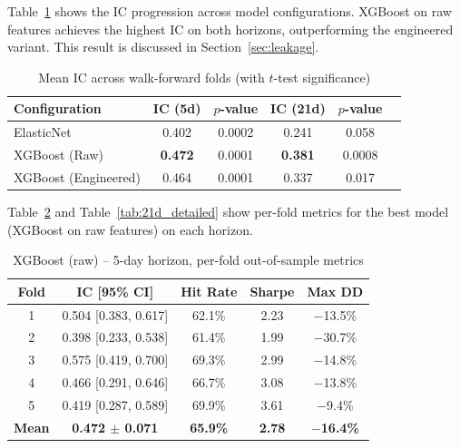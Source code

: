 \documentclass[11pt,a4paper]{article}
\makeatletter
\renewcommand\section{\@startsection{section}{1}{\z@}{-3.5ex \@plus -1ex \@minus -.2ex}{2.3ex \@plus.2ex}{\normalfont\large\bfseries\color{darkblue}}}
\makeatother
\begin{document}
\section{Results}

Table~\ref{tab:model_comp} shows the IC progression across model configurations. XGBoost on raw features achieves the highest IC on both horizons, outperforming the engineered variant. This result is discussed in Section~\ref{sec:leakage}.

\begin{table}[htbp]
\centering
\caption{Mean IC across walk-forward folds (with $t$-test significance)}
\label{tab:model_comp}
\begin{tabular}{@{}lccccc@{}}
\toprule
\textbf{Configuration} & \textbf{IC (5d)} & \textbf{$p$-value} & \textbf{IC (21d)} & \textbf{$p$-value} \\
\midrule
ElasticNet & 0.402 & 0.0002 & 0.241 & 0.058 \\
XGBoost (Raw) & \textbf{0.472} & 0.0001 & \textbf{0.381} & 0.0008 \\
XGBoost (Engineered) & 0.464 & 0.0001 & 0.337 & 0.017 \\
\bottomrule
\end{tabular}
\end{table}

Table~\ref{tab:5d_detailed} and Table~\ref{tab:21d_detailed} show per-fold metrics for the best model (XGBoost on raw features) on each horizon.

\begin{table}[htbp]
\centering
\caption{XGBoost (raw) -- 5-day horizon, per-fold out-of-sample metrics}
\label{tab:5d_detailed}
\begin{tabular}{@{}ccccc@{}}
\toprule
\textbf{Fold} & \textbf{IC [95\% CI]} & \textbf{Hit Rate} & \textbf{Sharpe} & \textbf{Max DD} \\
\midrule
1 & 0.504 [0.383, 0.617] & 62.1\% & 2.23 & $-$13.5\% \\
2 & 0.398 [0.233, 0.538] & 61.4\% & 1.99 & $-$30.7\% \\
3 & 0.575 [0.419, 0.700] & 69.3\% & 2.99 & $-$14.8\% \\
4 & 0.466 [0.291, 0.646] & 66.7\% & 3.08 & $-$13.8\% \\
5 & 0.419 [0.287, 0.589] & 69.9\% & 3.61 & $-$9.4\% \\
\midrule
\textbf{Mean} & \textbf{0.472 $\pm$ 0.071} & \textbf{65.9\%} & \textbf{2.78} & \textbf{$-$16.4\%} \\
\bottomrule
\end{tabular}
\end{table}
\end{document}

